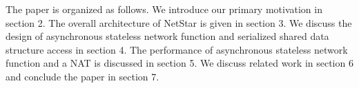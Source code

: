 The paper is organized as follows. We introduce our primary motivation in section 2. The overall architecture of NetStar is given in section 3. We discuss the design of asynchronous stateless network function and serialized shared data structure access in section 4. The performance of asynchronous stateless network function and a NAT is discussed in section 5. We discuss related work in section 6 and conclude the paper in section 7.

